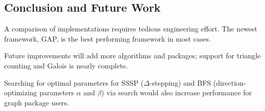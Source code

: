 \documentclass[conference]{IEEEtran}
\begin{document}
\subsection{Conclusion and Future Work}
A comparison of implementations requires tedious engineering effort. The newest framework, GAP, is the best performing framework in most cases.

Future improvements will add more algorithms and packages; support for triangle counting and Galois \cite{Nguyen:2013:Galois} is nearly complete.

Searching for optimal parameters for SSSP ($\Delta$-stepping) and BFS (direction-optimizing parameters $\alpha$ and $\beta$) via search would also increase performance for graph package users.



\end{document}
